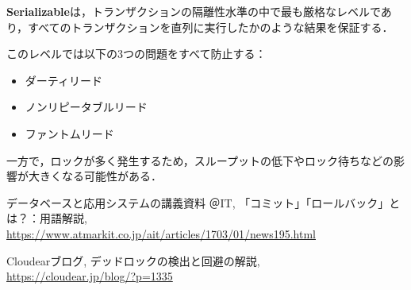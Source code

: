 \documentclass[titlepage,a4paper]{jsarticle}
\begin{document}
\textbf{Serializable}は，トランザクションの隔離性水準の中で最も厳格なレベルであり，すべてのトランザクションを直列に実行したかのような結果を保証する．

このレベルでは以下の3つの問題をすべて防止する：
\begin{itemize}
  \item ダーティリード
  \item ノンリピータブルリード
  \item ファントムリード
\end{itemize}

一方で，ロックが多く発生するため，スループットの低下やロック待ちなどの影響が大きくなる可能性がある．

\begin{thebibliography}{99}
  \bibitem{}データベースと応用システムの講義資料
＠IT, 「コミット」「ロールバック」とは？：用語解説,\\
\url{https://www.atmarkit.co.jp/ait/articles/1703/01/news195.html}

Cloudearブログ, デッドロックの検出と回避の解説,\\
\url{https://cloudear.jp/blog/?p=1335}
\end{thebibliography}
\end{document}
